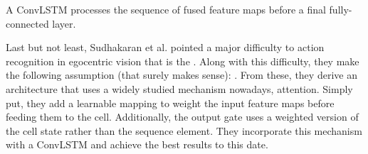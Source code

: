 \documentclass[12pt, a4paper]{report}
\begin{document}
					A ConvLSTM processes the sequence of fused feature maps before a final fully-connected layer.
					\par
					Last but not least, Sudhakaran et al. \cite{sudhakaran2019lsta} pointed a major difficulty to action recognition in egocentric vision that is the .
					Along with this difficulty, they make the following assumption (that surely makes sense): .
					From these, they derive an architecture that uses a widely studied mechanism nowadays, attention.
					Simply put, they add a learnable mapping to weight the input feature maps before feeding them to the cell.
					Additionally, the output gate uses a weighted version of the cell state rather than the sequence element.
					They incorporate this mechanism with a ConvLSTM and achieve the best results to this date.
\end{document}
